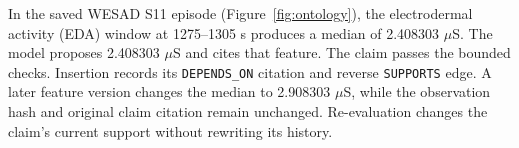 In the saved WESAD S11 episode (Figure~\ref{fig:ontology}), the electrodermal activity (EDA) window at 1275--1305 s produces a median of 2.408303 $\mu$S. The model proposes 2.408303 $\mu$S and cites that feature. The claim passes the bounded checks. Insertion records its \texttt{DEPENDS\_ON} citation and reverse \texttt{SUPPORTS} edge. A later feature version changes the median to 2.908303 $\mu$S, while the observation hash and original claim citation remain unchanged. Re-evaluation changes the claim's current support without rewriting its history.
